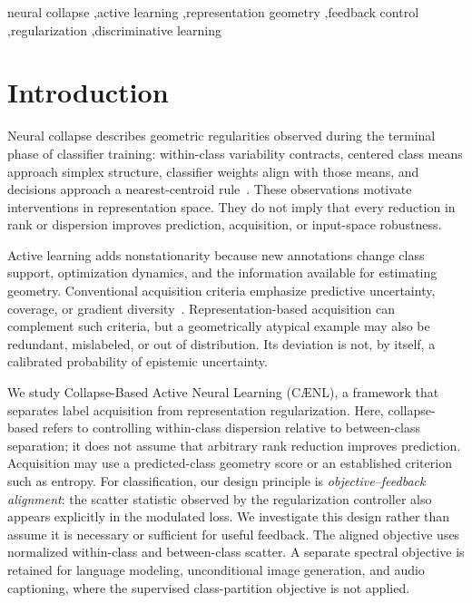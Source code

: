 \documentclass[a4paper,fleqn]{cas-dc}
\newcommand{\model}{C\AE{}NL}
\begin{document}
\begin{keywords}
neural collapse \sep active learning \sep representation geometry
\sep feedback control \sep regularization \sep discriminative learning
\end{keywords}
\maketitle
{}

\section{Introduction}\label{sec:intro}

Neural collapse describes geometric regularities observed during the
terminal phase of classifier training: within-class variability
contracts, centered class means approach simplex structure, classifier
weights align with those means, and decisions approach a
nearest-centroid rule~\cite{papyan2020prevalence}. These observations
motivate interventions in representation space. They do not imply that
every reduction in rank or dispersion improves prediction,
acquisition, or input-space robustness.

Active learning adds nonstationarity because new annotations change
class support, optimization dynamics, and the information available for
estimating geometry. Conventional acquisition criteria emphasize
predictive uncertainty, coverage, or gradient
diversity~\cite{settles2009active,sener2018active,ash2020badge}.
Representation-based acquisition can complement such criteria, but a
geometrically atypical example may also be redundant, mislabeled, or
out of distribution. Its deviation is not, by itself, a calibrated
probability of epistemic uncertainty.

We study Collapse-Based Active Neural Learning (\model{}), a framework
that separates label acquisition from representation regularization.
Here, collapse-based refers to controlling within-class dispersion
relative to between-class separation; it does not assume that arbitrary
rank reduction improves prediction. Acquisition may use a predicted-class
geometry score or an established criterion such as entropy.
For classification, our design principle is
\emph{objective--feedback alignment}: the scatter statistic observed by
the regularization controller also appears explicitly in the modulated
loss. We investigate this design rather than assume it is necessary or
sufficient for useful feedback. The aligned objective uses normalized
within-class and between-class scatter. A separate spectral objective
is retained for language modeling, unconditional image generation, and
audio captioning, where the supervised class-partition objective is not
applied.
\end{document}
